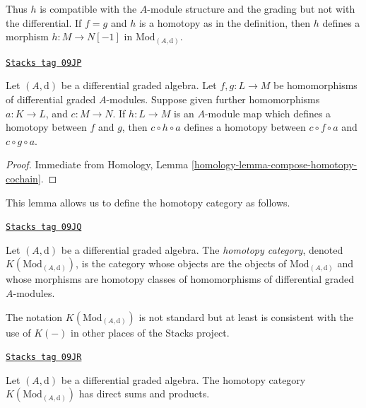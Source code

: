 Thus $h$ is compatible with the $A$-module structure and the grading
but not with the differential. If $f = g$ and $h$ is a homotopy
as in the definition, then $h$ defines a morphism $h : M \to N[-1]$
in $\text{Mod}_{(A, \text{d})}$.

\begin{lemma}
\label{dga-lemma-compose-homotopy}
\href{https://stacks.math.columbia.edu/tag/09JP}{\texttt{Stacks tag 09JP}}

Let $(A, \text{d})$ be a differential graded algebra.
Let $f, g : L \to M$ be homomorphisms of differential graded $A$-modules.
Suppose given further homomorphisms $a : K \to L$, and $c : M \to N$.
If $h : L \to M$ is an $A$-module map which defines a homotopy between
$f$ and $g$, then $c \circ h \circ a$ defines a homotopy between
$c \circ f \circ a$ and $c \circ g \circ a$.
\end{lemma}

\begin{proof}
Immediate from Homology, Lemma \ref{homology-lemma-compose-homotopy-cochain}.
\end{proof}

This lemma allows us to define the homotopy category as follows.

\begin{definition}
\label{dga-definition-complexes-notation}
\href{https://stacks.math.columbia.edu/tag/09JQ}{\texttt{Stacks tag 09JQ}}

Let $(A, \text{d})$ be a differential graded algebra.
The {\it homotopy category}, denoted $K(\text{Mod}_{(A, \text{d})})$, is
the category whose objects are the objects of
$\text{Mod}_{(A, \text{d})}$ and whose morphisms are homotopy classes
of homomorphisms of differential graded $A$-modules.
\end{definition}

The notation $K(\text{Mod}_{(A, \text{d})})$ is not standard but at least is
consistent with the use of $K(-)$ in other places of the Stacks project.

\begin{lemma}
\label{dga-lemma-homotopy-direct-sums}
\href{https://stacks.math.columbia.edu/tag/09JR}{\texttt{Stacks tag 09JR}}

Let $(A, \text{d})$ be a differential graded algebra.
The homotopy category $K(\text{Mod}_{(A, \text{d})})$
has direct sums and products.
\end{lemma}

